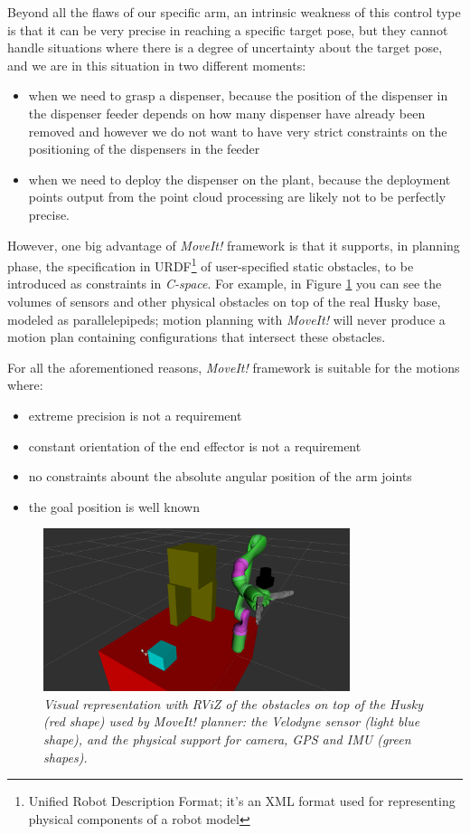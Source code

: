 Beyond all the flaws of our specific arm, an intrinsic weakness of this control type is that it can be very precise in reaching a specific target pose, but they cannot handle situations where there is a degree of uncertainty about the target pose, and we are in this situation in two different moments:
\begin{itemize}
	\item when we need to grasp a dispenser, because the position of the dispenser in the dispenser feeder depends on how many dispenser have already been removed and however we do not want to have very strict constraints on the positioning of the dispensers in the feeder
	\item when we need to deploy the dispenser on the plant, because the deployment points output from the point cloud processing are likely not to be perfectly precise.
\end{itemize}
However, one big advantage of \textit{MoveIt!} framework is that it supports, in planning phase, the specification in URDF\footnote{Unified Robot Description Format; it's an XML format used for representing physical components of a robot model}
of user-specified static obstacles, to be introduced as constraints in \textit{C-space}. For example, in Figure \ref{fig:moveItObstacles} you can see the volumes of sensors and other physical obstacles on top of the real Husky base, modeled as parallelepipeds; motion planning with \textit{MoveIt!} will never produce a motion plan containing configurations that intersect these obstacles.

For all the aforementioned reasons, \textit{MoveIt!} framework is suitable for the motions where:
\begin{itemize}
	\item extreme precision is not a requirement
	\item constant orientation of the end effector is not a requirement
	\item no constraints abount the absolute angular position of the arm joints
	\item the goal position is well known
\end{itemize}


\begin{figure}
	\centering
	\includegraphics[width=0.8\textwidth]{Images/arm/kinova_prepare_rviz.png}
	\caption{\textit{Visual representation with RViZ of the obstacles on top of the Husky (red shape) used by MoveIt! planner: the Velodyne sensor (light blue shape), and the physical support for camera, GPS and \ac{IMU} (green shapes).}}
	\label{fig:moveItObstacles}
\end{figure}



